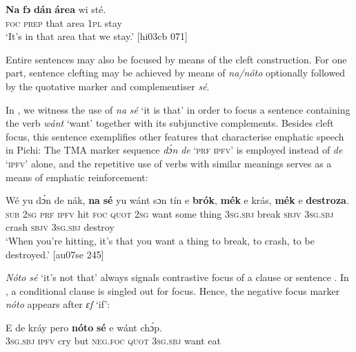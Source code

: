 \ea%
    \label{ex:key:709}
    \gll \textbf{Na}  \textbf{fɔ}  \textbf{dán}  \textbf{área}  wi  sté.\\
\textsc{foc}  \textsc{prep}  that  area    \textsc{1pl}  stay\\

\glt ‘It’s in that area that we stay.’ [hi03cb 071]
\z

Entire sentences may also be focused by means of the cleft construction. For one part, sentence clefting may be achieved by means of \textit{na/nóto} optionally followed by the quotative marker and complementiser \textit{sé}.


In , we witness the use of \textit{na} \textit{sé} ‘it is that’ in order to focus a sentence containing the verb \textit{wánt} ‘want’ together with its subjunctive complements. Besides cleft focus, this sentence exemplifies other features that characterise emphatic speech in Pichi: The TMA marker sequence \textit{dɔ́n} \textit{de} ‘\textsc{prf} \textsc{ipfv’} is employed instead of \textit{de} \textsc{‘ipfv’} alone, and the repetitive use of verbs with similar meanings serves as a means of emphatic reinforcement: 



\ea%
    \label{ex:key:710}
    \gll Wé  yu  dɔ́n  de  nák,    \textbf{na}  \textbf{sé}    yu  wánt  sɔn    tín    
e    \textbf{brók},  \textbf{mék}    e    krás,  \textbf{mék}    e    \textbf{destroza}.\\
\textsc{sub}  \textsc{2sg}  \textsc{prf}  \textsc{ipfv}  hit    \textsc{foc}  \textsc{quot}    \textsc{2sg}  want  some  thing  
\textsc{3sg.sbj}  break   \textsc{sbjv}    \textsc{3sg.sbj}  crash  \textsc{sbjv}    \textsc{3sg.sbj}  destroy\\

\glt ‘When you’re hitting, it’s that you want a thing to break, to crash, to be 
destroyed.’ [au07se 245]
\z

\textit{Nóto sé} ‘it’s not that’ always signals contrastive focus of a clause or sentence . In , a conditional clause is singled out for focus. Hence, the negative focus marker \textit{nóto} appears after \textit{ɛf} ‘if’:


\ea%
    \label{ex:key:711}
    \gll E    de  kráy    pero  \textbf{nóto}  \textbf{sé}    e    wánt  chɔ́p.\\
\textsc{3sg.sbj}  \textsc{ipfv}  cry    but    \textsc{neg}.\textsc{foc}  \textsc{quot}    \textsc{3sg.sbj}  want  eat\\

